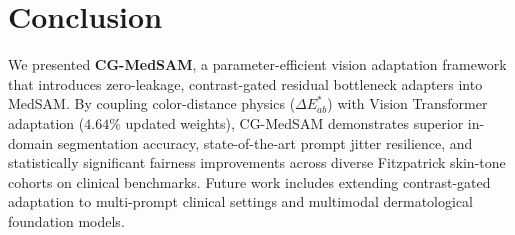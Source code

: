 \documentclass[runningheads]{llncs}
\begin{document}
\begin{table}[t]
\centering
\caption{Causal signal ablation study evaluating physical contrast conditioning on sDDI ($N=198$). Bold denotes optimal fairness.}
\label{tab:causal_ablation}
\end{table}

\section{Conclusion}
We presented \textbf{CG-MedSAM}, a parameter-efficient vision adaptation framework that introduces zero-leakage, contrast-gated residual bottleneck adapters into MedSAM. By coupling color-distance physics ($\Delta E^*_{ab}$) with Vision Transformer adaptation ($4.64\%$ updated weights), CG-MedSAM demonstrates superior in-domain segmentation accuracy, state-of-the-art prompt jitter resilience, and statistically significant fairness improvements across diverse Fitzpatrick skin-tone cohorts on clinical benchmarks. Future work includes extending contrast-gated adaptation to multi-prompt clinical settings and multimodal dermatological foundation models.



\end{document}
